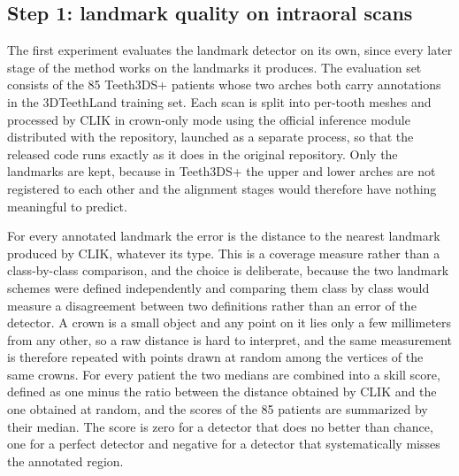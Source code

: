 \documentclass[10pt,a4paper]{article}
\begin{document}
\subsection{Step 1: landmark quality on intraoral scans}
\label{sec:exp-step1}

The first experiment evaluates the landmark detector on its own, since every later stage of the method works on the landmarks it produces. The evaluation set consists of the 85 Teeth3DS+ patients whose two arches both carry annotations in the 3DTeethLand training set. Each scan is split into per-tooth meshes and processed by CLIK in crown-only mode using the official inference module distributed with the repository, launched as a separate process, so that the released code runs exactly as it does in the original repository. Only the landmarks are kept, because in Teeth3DS+ the upper and lower arches are not registered to each other and the alignment stages would therefore have nothing meaningful to predict.

For every annotated landmark the error is the distance to the nearest landmark produced by CLIK, whatever its type. This is a coverage measure rather than a class-by-class comparison, and the choice is deliberate, because the two landmark schemes were defined independently and comparing them class by class would measure a disagreement between two definitions rather than an error of the detector. A crown is a small object and any point on it lies only a few millimeters from any other, so a raw distance is hard to interpret, and the same measurement is therefore repeated with points drawn at random among the vertices of the same crowns. For every patient the two medians are combined into a skill score, defined as one minus the ratio between the distance obtained by CLIK and the one obtained at random, and the scores of the 85 patients are summarized by their median. The score is zero for a detector that does no better than chance, one for a perfect detector and negative for a detector that systematically misses the annotated region.
\end{document}

